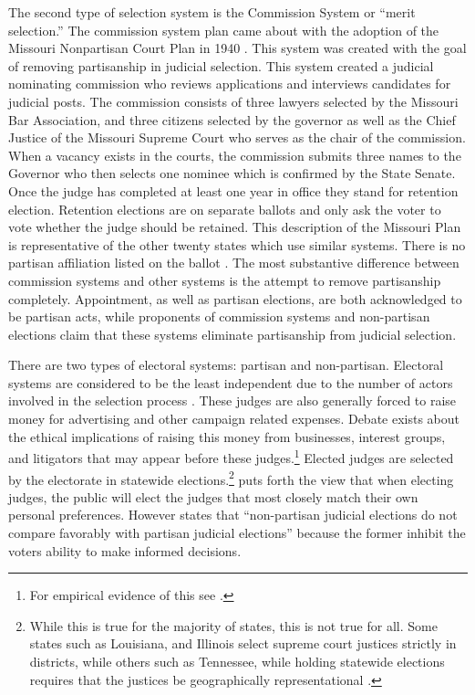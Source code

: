 \documentclass[12pt]{article}
\begin{document}
The second type of selection system is the Commission System or “merit selection.” The commission system plan came about with the adoption of the Missouri Nonpartisan Court Plan in 1940 \citep{Watson1969}. This system was created with the goal of removing partisanship in judicial selection. This system created a judicial nominating commission who reviews applications and interviews candidates for judicial posts. The commission consists of three lawyers selected by the Missouri Bar Association, and three citizens selected by the governor as well as the Chief Justice of the Missouri Supreme Court who serves as the chair of the commission. When a vacancy exists in the courts, the commission submits three names to the Governor who then selects one nominee which is confirmed by the State Senate. Once the judge has completed at least one year in office they stand for retention election. Retention elections are on separate ballots and only ask the voter to vote whether the judge should be retained. This description of the Missouri Plan is representative of the other twenty states which use similar systems.  There is no partisan affiliation listed on the ballot \citep{Watson1969}.  The most substantive difference between commission systems and other systems is the attempt to remove partisanship completely. Appointment, as well as partisan elections, are both acknowledged to be partisan acts, while proponents of commission systems and non-partisan elections claim that these systems eliminate partisanship from judicial selection. 

There are two types of electoral systems: partisan and non-partisan.  Electoral systems are considered to be the least independent due to the number of actors involved in the selection process \citep{Choi2010}. These judges are also generally forced to raise money for advertising and other campaign related expenses.  Debate exists about the ethical implications of raising this money from businesses, interest groups, and litigators that may appear before these judges.\footnote{For empirical evidence of this see \citep{Gibson2008}.}  Elected judges are selected by the electorate in statewide elections.\footnote{While this is true for the majority of states, this is not true for all.  Some states such as Louisiana, and Illinois select supreme court justices strictly in districts, while others such as Tennessee, while holding statewide elections requires that the justices be geographically representational \citep{Bonneau2010}.}  \citet{Caldarone2009} puts forth the view that when electing judges, the public will elect the judges that most closely match their own personal preferences.  However \citet{Debow2013} states that ``non-partisan judicial elections do not compare favorably with partisan judicial elections'' because the former inhibit the voters ability to make informed decisions.
\end{document}
